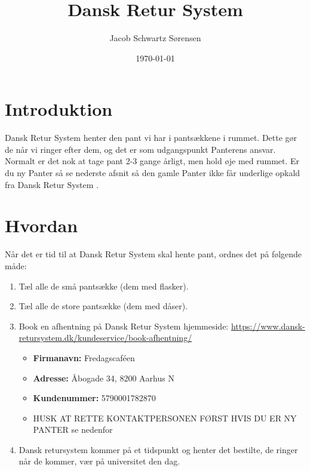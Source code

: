 

\title{Dansk Retur System}
\date{\today}
\author{Jacob Schwartz Sørensen}



\maketitle

\newcommand{\DRS}{Dansk Retur System }

\section{Introduktion}
\label{sec:Introduktion}

\DRS henter den pant vi har i pantsækkene i rummet. Dette gør de når vi ringer efter dem, og det er som udgangspunkt Panterens ansvar.
Normalt er det nok at tage pant 2-3 gange årligt, men hold øje med rummet.
Er du ny Panter så se nederste afsnit så den gamle Panter ikke får underlige opkald fra \DRS.

\section{Hvordan}
\label{sec:Hvordan}

Når det er tid til at \DRS skal hente pant, ordnes det på følgende måde:

\begin{enumerate}
	\item Tæl alle de små pantsække (dem med flasker).
	\item Tæl alle de store pantsække (dem med dåser).
	\item Book en afhentning på \DRS hjemmeside: \url{https://www.dansk-retursystem.dk/kundeservice/book-afhentning/}
	\begin{itemize}
		\item \textbf{Firmanavn:} Fredagscaféen
		\item \textbf{Adresse:} Åbogade 34, 8200 Aarhus N
		\item \textbf{Kundenummer:} 5790001782870
		\item HUSK AT RETTE KONTAKTPERSONEN FØRST HVIS DU ER NY PANTER se nedenfor
	\end{itemize}
	\item Dansk retursystem kommer på et tidspunkt og henter det bestilte, de ringer når de kommer, vær på universitet den dag.
\end{enumerate}

